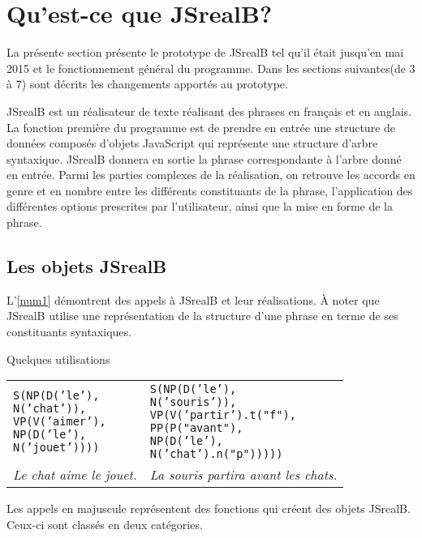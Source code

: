 \documentclass[11pt]{article} %
\newcommand{\system}[1]{\textsf{#1}}
\newcommand{\JSB}{\system{JSrealB}}
\newcommand{\real}[1]{\emph{#1}}
\begin{document}
\section{Qu'est-ce que \JSB{}?}

La présente section présente le prototype de \JSB{} tel qu'il
était jusqu'en mai 2015 et le fonctionnement général du programme. 
Dans les sections suivantes(de 3 à 7) sont décrits
les changements apportés au prototype.

\JSB{} est un réalisateur de texte réalisant des phrases en français
et en anglais. La fonction première du programme est de prendre en
entrée une structure de données composés d'objets JavaScript
qui représente une structure d'arbre syntaxique.
\JSB{} donnera en sortie la phrase correspondante à l'arbre donné
en entrée. Parmi les parties complexes de la réalisation, on retrouve
les accords en genre et en nombre entre les différents constituants
de la phrase, l'application des différentes options prescrites par
l'utilisateur, ainsi que la mise en forme de la phrase. 

\subsection{Les objets \JSB{}}

L'\autoref{num1} démontrent des appels à \JSB{} et leur réalisations. À noter que
\JSB{} utilise une représentation de la structure d'une phrase en terme
de ses constituants syntaxiques.\newline
\begin{example}
\caption{Quelques utilisations}
\begin{tabular}{p{7cm} p{7cm}}
\begin{alltt}
S(NP(D('le'),
     N('chat')),
  VP(V('aimer'),
     NP(D('le'),
        N('jouet'))))
\end{alltt} &
\begin{alltt}
S(NP(D('le'),
     N('souris')),
  VP(V('partir').t("f"),
     PP(P("avant"),
        NP(D('le'),
           N('chat').n("p")))))
\end{alltt} \\
\real{Le chat aime le jouet.} & \real{La souris partira avant les chats.} \\
\end{tabular}
\label{num1}
\end{example}

Les appels en majuscule représentent des fonctions qui créent des objets \JSB{}. Ceux-ci sont
classés en deux catégories. 
\end{document}

